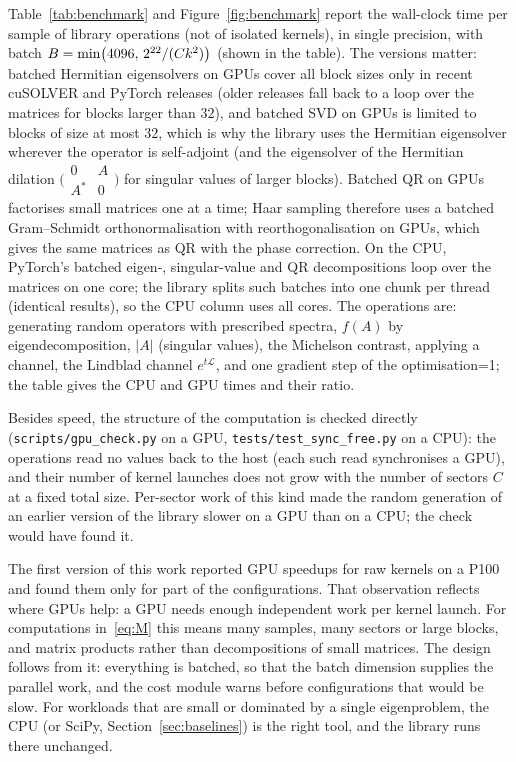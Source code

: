 \documentclass[11pt]{article}
\providecommand{\BenchHasGPU}{0}
\begin{document}
Table~\ref{tab:benchmark} and Figure~\ref{fig:benchmark} report the wall-clock time per sample of library
operations (not of isolated kernels), in single precision, with batch $B=\min\bigl(4096,\,\IfFileExists{generated/benchmark.tex}{2^{\BenchTargetLog}}{2^{22}}/(Ck^2)\bigr)$ (shown in the table). The versions matter:
batched Hermitian eigensolvers on GPUs cover all block sizes only in recent cuSOLVER and PyTorch releases (older
releases fall back to a loop over the matrices for blocks larger than $32$), and batched SVD on GPUs is limited to blocks
of size at most $32$, which is why the library uses the Hermitian eigensolver wherever the operator is self-adjoint
(and the eigensolver of the Hermitian dilation $\bigl(\begin{smallmatrix}0&A\\A^*&0\end{smallmatrix}\bigr)$ for singular values of
larger blocks). Batched QR on GPUs factorises small matrices one at a time; Haar sampling therefore uses a batched
Gram--Schmidt orthonormalisation with reorthogonalisation on GPUs, which gives the same matrices as QR with the phase
correction. On the CPU, PyTorch's batched eigen-, singular-value and QR decompositions loop over the matrices on one
core; the library splits such batches into one chunk per thread (identical results), so the CPU column uses all cores.
The operations are: generating random operators with prescribed spectra, $f(A)$ by eigendecomposition, $|A|$ (singular
values), the Michelson contrast, applying a channel, the Lindblad channel $e^{t\mathcal L}$, and one gradient step of
the optimisation\ifnum\BenchHasGPU=1; the table gives the CPU and GPU times and their ratio\fi.

Besides speed, the structure of the computation is checked directly (\texttt{scripts/gpu\_check.py} on a GPU,
\texttt{tests/test\_sync\_free.py} on a CPU): the operations read no values back to the host (each such read
synchronises a GPU), and their number of kernel launches does not grow with the number of sectors $C$ at a fixed total
size. Per-sector work of this kind made the random generation of an earlier version of the library slower on a GPU
than on a CPU; the check would have found it.

The first version of this work reported GPU speedups for raw kernels on a P100 and found them only for part of the
configurations. That observation reflects where GPUs help: a GPU needs enough independent work per kernel launch.
For computations in~\eqref{eq:M} this means many samples, many sectors or large blocks, and matrix products rather
than decompositions of small matrices. The design follows from it: everything is batched, so that the batch
dimension supplies the parallel work, and the cost module warns before configurations that would be slow. For
workloads that are small or dominated by a single eigenproblem, the CPU (or SciPy, Section~\ref{sec:baselines}) is
the right tool, and the library runs there unchanged.
\end{document}
